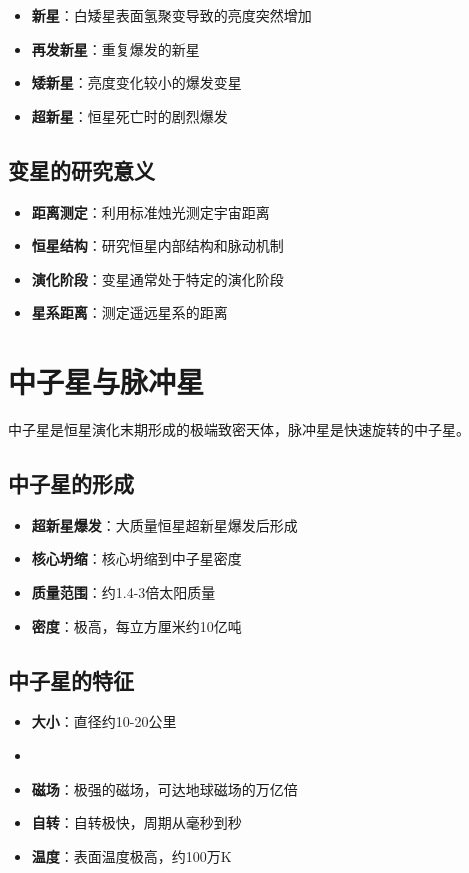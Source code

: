\documentclass[12pt,UTF8]{ctexbook}
\begin{document}
\begin{itemize}
  \item \textbf{新星}：白矮星表面氢聚变导致的亮度突然增加
  \item \textbf{再发新星}：重复爆发的新星
  \item \textbf{矮新星}：亮度变化较小的爆发变星
  \item \textbf{超新星}：恒星死亡时的剧烈爆发
\end{itemize}

\subsection{变星的研究意义}

\begin{itemize}
  \item \textbf{距离测定}：利用标准烛光测定宇宙距离
  \item \textbf{恒星结构}：研究恒星内部结构和脉动机制
  \item \textbf{演化阶段}：变星通常处于特定的演化阶段
  \item \textbf{星系距离}：测定遥远星系的距离
\end{itemize}

\section{中子星与脉冲星}

中子星是恒星演化末期形成的极端致密天体，脉冲星是快速旋转的中子星。

\subsection{中子星的形成}

\begin{itemize}
  \item \textbf{超新星爆发}：大质量恒星超新星爆发后形成
  \item \textbf{核心坍缩}：核心坍缩到中子星密度
  \item \textbf{质量范围}：约1.4-3倍太阳质量
  \item \textbf{密度}：极高，每立方厘米约10亿吨
\end{itemize}

\subsection{中子星的特征}

\begin{itemize}
  \item \textbf{大小}：直径约10-20公里
  \item \item \textbf{磁场}：极强的磁场，可达地球磁场的万亿倍
  \item \textbf{自转}：自转极快，周期从毫秒到秒
  \item \textbf{温度}：表面温度极高，约100万K
\end{itemize}
\end{document}
